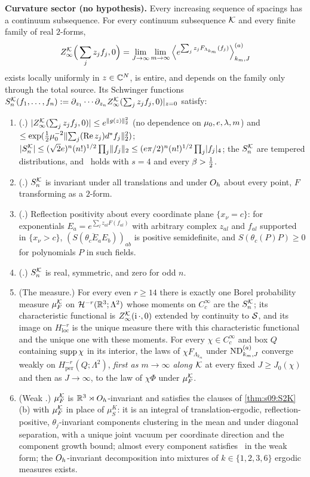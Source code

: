 \begin{theorem}
\textbf{Curvature sector (no hypothesis).} Every increasing sequence of spacings has a continuum subsequence. For every continuum subsequence $\mathcal K$ and every finite family of real $2$-forms,
\[
Z^{\mathcal K}_{\infty}\Big(\sum_jz_jf_j,0\Big)=\lim_{J\to\infty}\lim_{m\to\infty}\Big\langle e^{\sum_jz_jF_{\Lambda_{k_m}}(f_j)}\Big\rangle^{(a)}_{k_m,J}
\]
exists locally uniformly in $z\in\mathbb C^N$, is entire, and depends on the family only through the total source. Its Schwinger functions $S^{\mathcal K}_n(f_1,\dots,f_n):=\partial_{z_1}\cdots\partial_{z_n}Z^{\mathcal K}_{\infty}(\sum_jz_jf_j,0)|_{z=0}$ satisfy:
\begin{enumerate}[label=\textup{(\roman*)},leftmargin=*,nosep]
\item \textup{(\OSz.)} $|Z^{\mathcal K}_{\infty}(\sum_jz_jf_j,0)|\le e^{\lVert g(z)\rVert_2^2}$ (no dependence on $\mu_0,e,\lambda,m$) and $\le\exp(\tfrac12\mu_0^{-2}\lVert \sum_j(\operatorname{Re} z_j)d^{*} f_j\rVert_2^2)$; $|S^{\mathcal K}_n|\le(\sqrt2e)^n(n!)^{1/2}\prod_j\lVert f_j\rVert_2\le(e\pi/2)^n(n!)^{1/2}\prod_j\lvert f_j\rvert_{4}$; the $S^{\mathcal K}_n$ are tempered distributions, and \Ezz\ holds with $s=4$ and every $\beta>\tfrac12$.
\item \textup{(\OSo.)} $S^{\mathcal K}_n$ is invariant under all translations and under $O_h$ about every point, $F$ transforming as a $2$-form.
\item \textup{(\OSt.)} Reflection positivity about every coordinate plane $\{x_\nu=c\}$: for exponentials $E_a=e^{\sum_lz_{al}F(f_{al})}$ with arbitrary complex $z_{al}$ and $f_{al}$ supported in $\{x_\nu>c\}$, $(S(\overline{\theta_cE_a}E_b))_{ab}$ is positive semidefinite, and $S(\theta_c(P)P)\ge0$ for polynomials $P$ in such fields.
\item \textup{(\OSth.)} $S^{\mathcal K}_n$ is real, symmetric, and zero for odd $n$.
\item \textup{(The measure.)} For every even $r\ge14$ there is exactly one Borel probability measure $\mu^{\mathcal K}_F$ on $\mathcal H^{-r}(\mathbb R^3;\Lambda^2)$ whose moments on $C^\infty_c$ are the $S^{\mathcal K}_n$; its characteristic functional is $Z^{\mathcal K}_{\infty}(\mathrm i\,\cdot,0)$ extended by continuity to $\mathcal S$, and its image on $H^{-r}_{\mathrm{loc}}$ is the unique measure there with this characteristic functional and the unique one with these moments. For every $\chi\in C^\infty_c$ and box $Q$ containing $\operatorname{supp}\chi$ in its interior, the laws of $\chi F_{\Lambda_{k_m}}$ under $\mathrm{ND}^{(a)}_{k_m,J}$ converge weakly on $H^{-r}_{\mathrm{per}}(Q;\Lambda^2)$, \emph{first as $m\to\infty$ along $\mathcal K$} at every fixed $J\ge J_0(\chi)$ and then as $J\to\infty$, to the law of $\chi\Phi$ under $\mu^{\mathcal K}_F$.
\item \textup{(Weak \OSf.)} $\mu^{\mathcal K}_F$ is $\mathbb R^3\rtimes O_h$-invariant and satisfies the clauses of \cref{thm:s09:S2K}(b) with $\mu^{\mathcal K}_F$ in place of $\mu^K_S$: it is an integral of translation-ergodic, reflection-positive, $\theta_j$-invariant components clustering in the mean and under diagonal separation, with a unique joint vacuum per coordinate direction and the component growth bound; almost every component satisfies \OSf\ in the weak form; the $O_h$-invariant decomposition into mixtures of $k\in\{1,2,3,6\}$ ergodic measures exists.

\end{enumerate}
\end{theorem}
